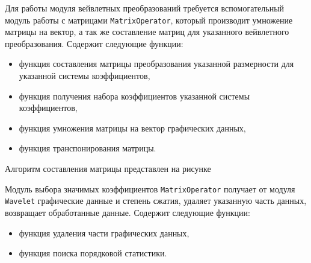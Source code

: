 Для работы модуля вейвлетных преобразований требуется вспомогательный модуль работы с матрицами \texttt{MatrixOperator}, 
который производит умножение матрицы на вектор, а так же составление матриц для указанного вейвлетного преобразования. Содержит следующие функции:
\begin{itemize}
\item функция составления матрицы преобразования указанной размерности для указанной системы коэффициентов,
\item функция получения набора коэффициентов указанной системы коэффициентов,
\item функция умножения матрицы на вектор графических данных,
\item функция транспонирования матрицы.
\end{itemize}
Алгоритм составления матрицы представлен на рисунке 

Модуль выбора значимых коэффициентов \texttt{MatrixOperator} получает от модуля \texttt{Wavelet} графические данные и степень сжатия, 
удаляет указанную часть данных, возвращает обработанные данные. Содержит следующие функции: 
\begin{itemize}
\item функция удаления части графических данных,
\item функция поиска порядковой статистики.
\end{itemize}
